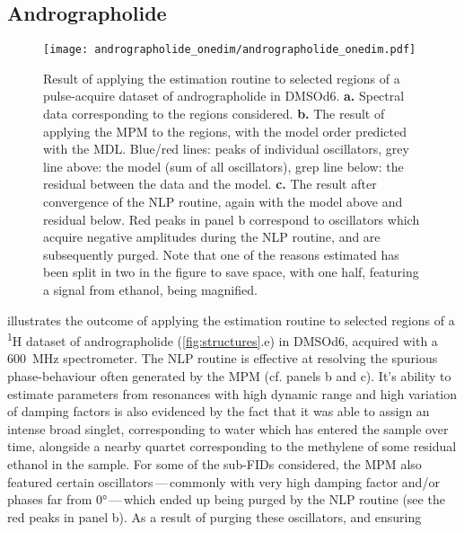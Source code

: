 \subsection{Andrographolide}
\begin{sidewaysfigure}
    \centering
    \texttt{[image: andrographolide\_onedim/andrographolide\_onedim.pdf]}
    \caption[
        Result of applying the estimation routine to selected regions of a
        pulse-acquire dataset of andrographolide.
    ]{
        Result of applying the estimation routine to selected regions of a
        pulse-acquire dataset of andrographolide in \acs{DMSOd6}.
        \textbf{a.} Spectral data corresponding to the regions considered.
        \textbf{b.} The result of applying the \acs{MPM} to the regions, with
        the model order predicted with the \acs{MDL}. Blue/red lines: peaks of
        individual oscillators, grey line above: the model (sum of all
        oscillators), grep line below: the residual between the data and the model.
        \textbf{c.} The result after convergence of the \acs{NLP} routine, again
        with the model above and residual below.
        Red peaks in panel b correspond to oscillators which acquire negative
        amplitudes during the \acs{NLP} routine, and are subsequently purged.
        Note that one of the reasons estimated has been split in two in the
        figure to save space, with one half, featuring a signal from ethanol,
        being magnified.
    }
    \label{fig:andro-onedim}
\end{sidewaysfigure}
 illustrates the outcome of applying the
estimation routine to selected regions of a \textsuperscript{1}H dataset of
andrographolide (\cref{fig:structures}.e) in \acs{DMSOd6}, acquired with
a \qty{600}{\mega\hertz} spectrometer.
The \ac{NLP} routine is effective at resolving the spurious phase-behaviour
often generated by the \ac{MPM} (cf. panels b and c).
It's ability to estimate parameters from resonances with high
dynamic range and high variation of damping factors is also evidenced by the
fact that it was able to assign an intense broad singlet, corresponding to
water which has entered the sample over time, alongside a nearby quartet
corresponding to the methylene of some residual ethanol in the sample.
For some of the sub-\acp{FID} considered, the \ac{MPM} also featured certain
oscillators\,---\,commonly with very high damping factor and/or phases far from
\ang{0}\,---\,which ended up being purged by the \ac{NLP} routine (see the red
peaks in panel b). As a result of purging these oscillators, and ensuring
